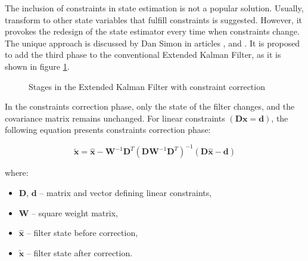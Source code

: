 The inclusion of constraints in state estimation is not a popular solution. Usually, transform to other state variables that fulfill constraints is suggested. However, it provokes the redesign of the state estimator every time when constraints change. The unique approach is discussed by Dan Simon in articles \cite{simon}, \cite{simon2010kalman} and \cite{simon2006kalman}. It is proposed to add the third phase to the conventional Extended Kalman Filter, as it is shown in figure \ref{ekf_three_phases}. \\

\begin{figure}[!h]
	\begin{center}
	\end{center}
	\caption{Stages in the Extended Kalman Filter with constraint correction}
	\label{ekf_three_phases}
\end{figure}

In the constraints correction phase, only the state of the filter changes, and the covariance matrix remains unchanged. For linear constraints $\left( \bm{D} \bm{x} = \bm{d}  \right)$, the following equation presents constraints correction phase:

\begin{equation}
	\bm{\tilde{x}} = \bm{\hat{x}} - \bm{W}^{-1} \bm{D}^T \left( \bm{D} \bm{W}^{-1} \bm{D}^T \right)^{-1} \left( \bm{D} \bm{\hat{x}} - \bm{d}  \right)
	\label{constraint_corr}
\end{equation}

where:
\begin{itemize}[noitemsep]
	\item $\bm{D}$, $\bm{d}$ -- matrix and vector defining linear constraints,
	\item $\bm{W}$ -- square weight matrix,
	\item $\bm{\hat{x}}$ -- filter state before correction,
	\item $\bm{\tilde{x}}$ -- filter state after correction.
\end{itemize}

